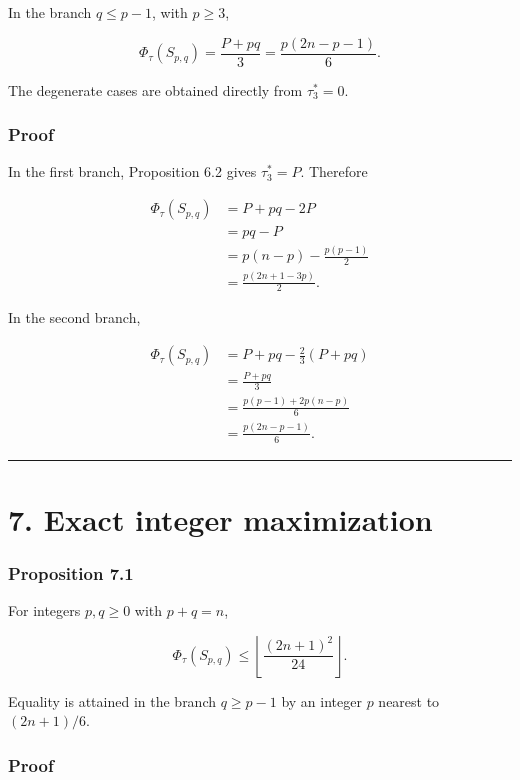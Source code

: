 \documentclass[
  11pt,
]{article}
\begin{document}
In the branch \(q\le p-1\), with \(p\ge3\),

\[
\Phi_\tau(S_{p,q})
=
\frac{P+pq}{3}
=
\frac{p(2n-p-1)}6.
\tag{6.2}
\]

The degenerate cases are obtained directly from \(\tau_3^*=0\).

\subsubsection{Proof}\label{proof-10}

In the first branch, Proposition 6.2 gives \(\tau_3^*=P\). Therefore

\[
\begin{aligned}
\Phi_\tau(S_{p,q})
&=
P+pq-2P\\
&=
pq-P\\
&=
p(n-p)-\frac{p(p-1)}2\\
&=
\frac{p(2n+1-3p)}2.
\end{aligned}
\]

In the second branch,

\[
\begin{aligned}
\Phi_\tau(S_{p,q})
&=
P+pq-\frac23(P+pq)\\
&=
\frac{P+pq}{3}\\
&=
\frac{p(p-1)+2p(n-p)}6\\
&=
\frac{p(2n-p-1)}6.
\end{aligned}
\]

\begin{center}\rule{0.5\linewidth}{0.5pt}\end{center}

\section{7. Exact integer
maximization}\label{exact-integer-maximization}

\subsubsection{Proposition 7.1}\label{proposition-7.1}

For integers \(p,q\ge0\) with \(p+q=n\),

\[
\Phi_\tau(S_{p,q})
\le
\left\lfloor\frac{(2n+1)^2}{24}\right\rfloor.
\]

Equality is attained in the branch \(q\ge p-1\) by an integer \(p\)
nearest to \((2n+1)/6\).

\subsubsection{Proof}\label{proof-11}
\end{document}
